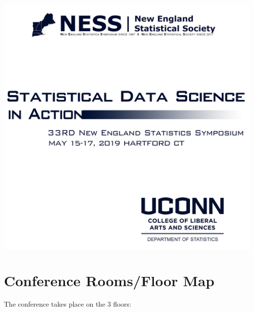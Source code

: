 \documentclass[10pt]{article}
\begin{document}
\hspace{0pt}
\vfill

\begin{center}
  \includegraphics{bag.jpg}
\end{center}


\vfill

\clearpage


\section*{Conference Rooms/Floor Map}

The conference takes place on the 3 floors:
\end{document}

